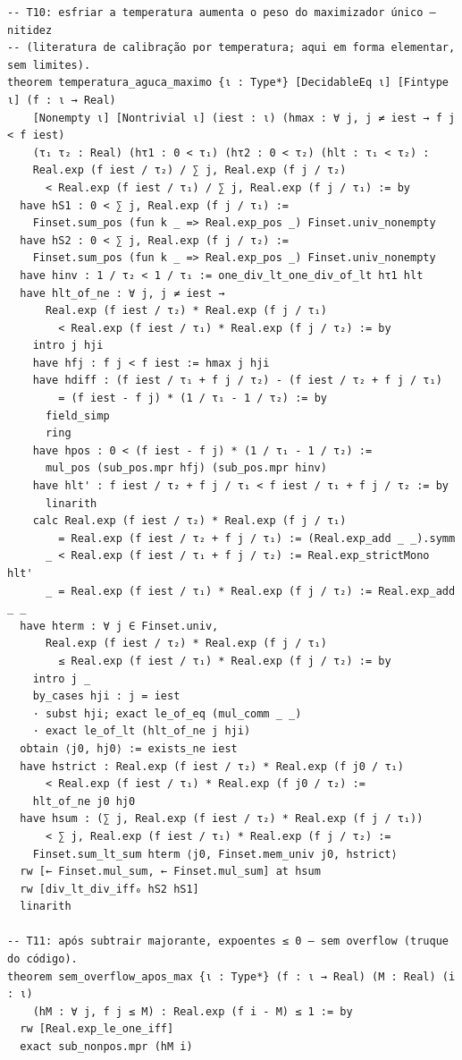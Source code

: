 \documentclass[12pt,openany,oneside,a4paper,brazil,chapter=TITLE]{abntex2}
\begin{document}
\begin{lstlisting}
-- T10: esfriar a temperatura aumenta o peso do maximizador único — nitidez
-- (literatura de calibração por temperatura; aqui em forma elementar, sem limites).
theorem temperatura_aguca_maximo {ι : Type*} [DecidableEq ι] [Fintype ι] (f : ι → Real)
    [Nonempty ι] [Nontrivial ι] (iest : ι) (hmax : ∀ j, j ≠ iest → f j < f iest)
    (τ₁ τ₂ : Real) (hτ1 : 0 < τ₁) (hτ2 : 0 < τ₂) (hlt : τ₁ < τ₂) :
    Real.exp (f iest / τ₂) / ∑ j, Real.exp (f j / τ₂)
      < Real.exp (f iest / τ₁) / ∑ j, Real.exp (f j / τ₁) := by
  have hS1 : 0 < ∑ j, Real.exp (f j / τ₁) :=
    Finset.sum_pos (fun k _ => Real.exp_pos _) Finset.univ_nonempty
  have hS2 : 0 < ∑ j, Real.exp (f j / τ₂) :=
    Finset.sum_pos (fun k _ => Real.exp_pos _) Finset.univ_nonempty
  have hinv : 1 / τ₂ < 1 / τ₁ := one_div_lt_one_div_of_lt hτ1 hlt
  have hlt_of_ne : ∀ j, j ≠ iest →
      Real.exp (f iest / τ₂) * Real.exp (f j / τ₁)
        < Real.exp (f iest / τ₁) * Real.exp (f j / τ₂) := by
    intro j hji
    have hfj : f j < f iest := hmax j hji
    have hdiff : (f iest / τ₁ + f j / τ₂) - (f iest / τ₂ + f j / τ₁)
        = (f iest - f j) * (1 / τ₁ - 1 / τ₂) := by
      field_simp
      ring
    have hpos : 0 < (f iest - f j) * (1 / τ₁ - 1 / τ₂) :=
      mul_pos (sub_pos.mpr hfj) (sub_pos.mpr hinv)
    have hlt' : f iest / τ₂ + f j / τ₁ < f iest / τ₁ + f j / τ₂ := by
      linarith
    calc Real.exp (f iest / τ₂) * Real.exp (f j / τ₁)
        = Real.exp (f iest / τ₂ + f j / τ₁) := (Real.exp_add _ _).symm
      _ < Real.exp (f iest / τ₁ + f j / τ₂) := Real.exp_strictMono hlt'
      _ = Real.exp (f iest / τ₁) * Real.exp (f j / τ₂) := Real.exp_add _ _
  have hterm : ∀ j ∈ Finset.univ,
      Real.exp (f iest / τ₂) * Real.exp (f j / τ₁)
        ≤ Real.exp (f iest / τ₁) * Real.exp (f j / τ₂) := by
    intro j _
    by_cases hji : j = iest
    · subst hji; exact le_of_eq (mul_comm _ _)
    · exact le_of_lt (hlt_of_ne j hji)
  obtain ⟨j0, hj0⟩ := exists_ne iest
  have hstrict : Real.exp (f iest / τ₂) * Real.exp (f j0 / τ₁)
      < Real.exp (f iest / τ₁) * Real.exp (f j0 / τ₂) :=
    hlt_of_ne j0 hj0
  have hsum : (∑ j, Real.exp (f iest / τ₂) * Real.exp (f j / τ₁))
      < ∑ j, Real.exp (f iest / τ₁) * Real.exp (f j / τ₂) :=
    Finset.sum_lt_sum hterm ⟨j0, Finset.mem_univ j0, hstrict⟩
  rw [← Finset.mul_sum, ← Finset.mul_sum] at hsum
  rw [div_lt_div_iff₀ hS2 hS1]
  linarith

-- T11: após subtrair majorante, expoentes ≤ 0 — sem overflow (truque do código).
theorem sem_overflow_apos_max {ι : Type*} (f : ι → Real) (M : Real) (i : ι)
    (hM : ∀ j, f j ≤ M) : Real.exp (f i - M) ≤ 1 := by
  rw [Real.exp_le_one_iff]
  exact sub_nonpos.mpr (hM i)
\end{lstlisting}
\end{document}
